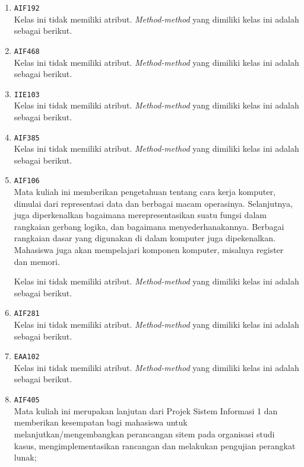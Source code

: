 \documentclass{article}
\begin{document}
\begin{enumerate}
\begin{itemize}
\end{itemize}
\item \texttt{AIF192}\\ 
Kelas ini tidak memiliki atribut. \textit{Method-method} yang dimiliki kelas ini adalah sebagai berikut.
\begin{itemize}
\end{itemize}
\item \texttt{AIF468}\\ 
Kelas ini tidak memiliki atribut. \textit{Method-method} yang dimiliki kelas ini adalah sebagai berikut.
\begin{itemize}
\end{itemize}
\item \texttt{IIE103}\\ 
Kelas ini tidak memiliki atribut. \textit{Method-method} yang dimiliki kelas ini adalah sebagai berikut.
\begin{itemize}
\end{itemize}
\item \texttt{AIF385}\\ 
Kelas ini tidak memiliki atribut. \textit{Method-method} yang dimiliki kelas ini adalah sebagai berikut.
\begin{itemize}
\end{itemize}
\item \texttt{AIF106}\\ 
Mata kuliah ini memberikan pengetahuan tentang cara kerja komputer, dimulai 
 dari representasi data dan berbagai macam operasinya. Selanjutnya, juga 
 diperkenalkan bagaimana merepresentasikan suatu fungsi dalam rangkaian 
 gerbang logika, dan bagaimana menyederhanakannya. Berbagai rangkaian dasar 
 yang digunakan di dalam komputer juga dipekenalkan. Mahasiswa juga akan 
 mempelajari komponen komputer, misalnya register dan memori.

Kelas ini tidak memiliki atribut. \textit{Method-method} yang dimiliki kelas ini adalah sebagai berikut.
\begin{itemize}
\end{itemize}
\item \texttt{AIF281}\\ 
Kelas ini tidak memiliki atribut. \textit{Method-method} yang dimiliki kelas ini adalah sebagai berikut.
\begin{itemize}
\end{itemize}
\item \texttt{EAA102}\\ 
Kelas ini tidak memiliki atribut. \textit{Method-method} yang dimiliki kelas ini adalah sebagai berikut.
\begin{itemize}
\end{itemize}
\item \texttt{AIF405}\\ 
Mata kuliah ini merupakan lanjutan dari Projek Sistem Informasi 1 dan
 memberikan kesempatan bagi mahasiswa untuk melanjutkan/mengembangkan
 perancangan sitem pada organisasi studi kasus, mengimplementasikan rancangan
 dan melakukan pengujian perangkat lunak;


\end{enumerate}
\end{document}
